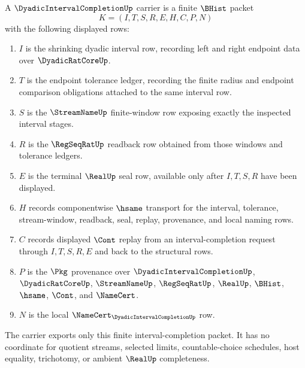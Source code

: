 \begin{definition}
\label{def:dyadic-interval-completion-carrier}
A $\DyadicIntervalCompletionUp$ carrier is a finite $\BHist$ packet
$$
K=(I,T,S,R,E,H,C,P,N)
$$
with the following displayed rows:
\begin{enumerate}
\item $I$ is the shrinking dyadic interval row, recording left and right endpoint data over $\DyadicRatCoreUp$.
\item $T$ is the endpoint tolerance ledger, recording the finite radius and endpoint comparison obligations attached to the same interval row.
\item $S$ is the $\StreamNameUp$ finite-window row exposing exactly the inspected interval stages.
\item $R$ is the $\RegSeqRatUp$ readback row obtained from those windows and tolerance ledgers.
\item $E$ is the terminal $\RealUp$ seal row, available only after $I,T,S,R$ have been displayed.
\item $H$ records componentwise $\hsame$ transport for the interval, tolerance, stream-window, readback, seal, replay, provenance, and local naming rows.
\item $C$ records displayed $\Cont$ replay from an interval-completion request through $I,T,S,R,E$ and back to the structural rows.
\item $P$ is the $\Pkg$ provenance over $\DyadicIntervalCompletionUp$, $\DyadicRatCoreUp$, $\StreamNameUp$, $\RegSeqRatUp$, $\RealUp$, $\BHist$, $\hsame$, $\Cont$, and $\NameCert$.
\item $N$ is the local $\NameCert_{\DyadicIntervalCompletionUp}$ row.
\end{enumerate}
The carrier exports only this finite interval-completion packet. It has no coordinate for quotient streams, selected limits, countable-choice schedules, host equality, trichotomy, or ambient $\RealUp$ completeness.
\end{definition}

